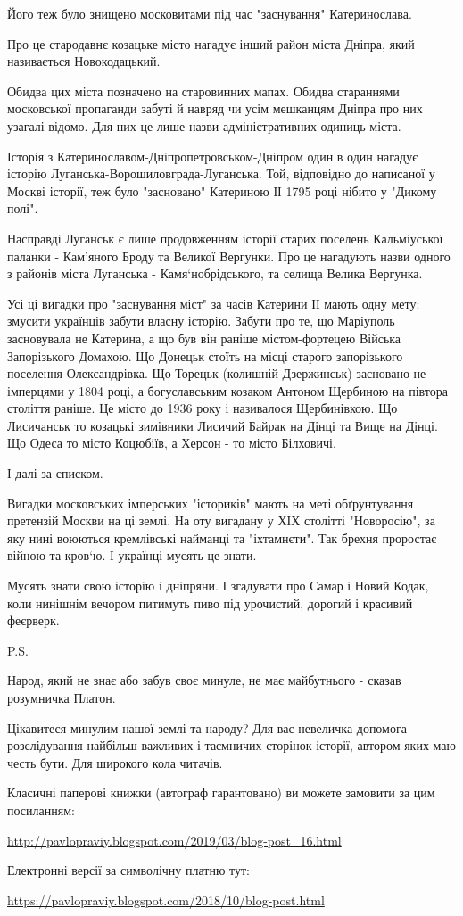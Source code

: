 Його теж було знищено московитами під час "заснування" Катеринослава. 

Про це стародавнє козацьке місто нагадує інший район міста Дніпра, який
називається Новокодацький.

Обидва цих міста позначено на старовинних мапах. Обидва стараннями московської
пропаганди забуті й навряд чи усім мешканцям Дніпра про них узагалі відомо. Для
них це лише назви адміністративних одиниць міста.

Історія з Катеринославом-Дніпропетровськом-Дніпром один в один нагадує історію
Луганська-Ворошиловграда-Луганська. Той, відповідно до написаної у Москві
історії, теж було "засновано" Катериною ІІ 1795 році нібито у "Дикому полі".

Насправді Луганськ є лише продовженням історії старих поселень Кальміуської
паланки - Кам'яного Броду та Великої Вергунки. Про це нагадують назви одного з
районів міста Луганська - Камя`нобрідського, та селища Велика Вергунка.

Усі ці вигадки про "заснування міст" за часів Катерини ІІ мають одну мету:
змусити українців забути власну історію. Забути про те, що Маріуполь
засновувала не Катерина, а що був він раніше містом-фортецею Війська
Запорізького Домахою. Що Донецьк стоїть на місці старого запорізького поселення
Олександрівка. Що Торецьк (колишній Дзержинськ) засновано не імперцями у 1804
році, а богуславським козаком Антоном Щербиною на півтора століття раніше. Це
місто до 1936 року і називалося Щербинівкою. Що Лисичанськ то козацькі
зимівники Лисичий Байрак на Дінці та Вище на Дінці. Що Одеса то місто Коцюбіїв,
а Херсон - то місто Білховичі.

І далі за списком.

Вигадки московських імперських "істориків" мають на меті обґрунтування
претензій Москви на ці землі. На оту вигадану у ХІХ столітті "Новоросію", за
яку нині воюються кремлівські найманці та "іхтамнєти". Так брехня проростає
війною та кров`ю. І українці мусять це знати.

Мусять знати свою історію і дніпряни. І згадувати про Самар і Новий Кодак, коли
нинішнім вечором питимуть пиво під урочистий, дорогий і красивий феєрверк.

P.S.

Народ, який не знає або забув своє минуле, не має майбутнього - сказав
розумничка Платон.

Цікавитеся минулим нашої землі та народу? Для вас невеличка допомога -
розслідування найбільш важливих і таємничих сторінок історії, автором яких маю
честь бути. Для широкого кола читачів.

Класичні паперові книжки (автограф гарантовано) ви можете замовити за цим посиланням: 

\url{http://pavlopraviy.blogspot.com/2019/03/blog-post_16.html}

Електронні версії за символічну платню тут: 

\url{https://pavlopraviy.blogspot.com/2018/10/blog-post.html}
